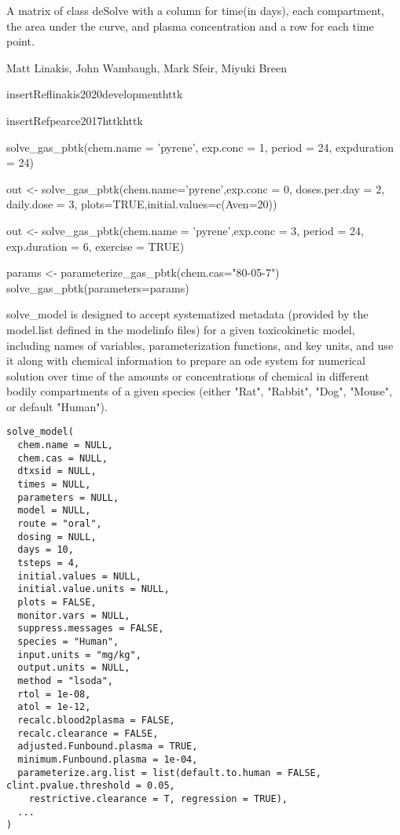\documentclass[a4paper]{book}
\begin{document}
%
\begin{Value}
A matrix of class deSolve with a column for time(in days), each
compartment, the area under the curve, and plasma concentration and a row
for each time point.
\end{Value}
%
\begin{Author}\relax
Matt Linakis, John Wambaugh, Mark Sfeir, Miyuki Breen
\end{Author}
%
\begin{References}\relax
\bsl{}insertReflinakis2020developmenthttk

\bsl{}insertRefpearce2017httkhttk
\end{References}
%
\begin{Examples}
\begin{ExampleCode}

solve_gas_pbtk(chem.name = 'pyrene', exp.conc = 1, period = 24, expduration = 24)


out <- solve_gas_pbtk(chem.name='pyrene',exp.conc = 0, doses.per.day = 2,
daily.dose = 3, plots=TRUE,initial.values=c(Aven=20))

out <- solve_gas_pbtk(chem.name = 'pyrene',exp.conc = 3, period = 24,
exp.duration = 6, exercise = TRUE)
                  
params <- parameterize_gas_pbtk(chem.cas="80-05-7")
solve_gas_pbtk(parameters=params)


\end{ExampleCode}
\end{Examples}
%
\begin{Description}\relax
solve\_model is designed to accept systematized metadata (provided by the
model.list defined in the modelinfo files) for a given 
toxicokinetic model, including names of variables, parameterization
functions, and key units, and use it along with chemical information
to prepare an ode system for numerical solution over time of the amounts
or concentrations of chemical in different bodily compartments of a given
species (either "Rat", "Rabbit", "Dog", "Mouse", or default "Human").
\end{Description}
%
\begin{Usage}
\begin{verbatim}
solve_model(
  chem.name = NULL,
  chem.cas = NULL,
  dtxsid = NULL,
  times = NULL,
  parameters = NULL,
  model = NULL,
  route = "oral",
  dosing = NULL,
  days = 10,
  tsteps = 4,
  initial.values = NULL,
  initial.value.units = NULL,
  plots = FALSE,
  monitor.vars = NULL,
  suppress.messages = FALSE,
  species = "Human",
  input.units = "mg/kg",
  output.units = NULL,
  method = "lsoda",
  rtol = 1e-08,
  atol = 1e-12,
  recalc.blood2plasma = FALSE,
  recalc.clearance = FALSE,
  adjusted.Funbound.plasma = TRUE,
  minimum.Funbound.plasma = 1e-04,
  parameterize.arg.list = list(default.to.human = FALSE, clint.pvalue.threshold = 0.05,
    restrictive.clearance = T, regression = TRUE),
  ...
)
\end{verbatim}
\end{Usage}
\end{document}
